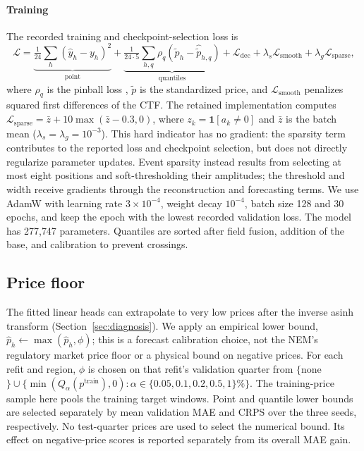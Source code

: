 \documentclass[preprint,12pt]{elsarticle}
\begin{document}
\paragraph{Training} The recorded training and checkpoint-selection loss is
\begin{equation}
\mathcal{L}=\underbrace{\tfrac{1}{24}\textstyle\sum_h(\hat y_h-y_h)^2}_{\text{point}}+\underbrace{\tfrac{1}{24\cdot5}\textstyle\sum_{h,q}\rho_q\!\left(\tilde p_h-\hat{\tilde p}_{h,q}\right)}_{\text{quantiles}}+\mathcal{L}_{\mathrm{dec}}+\lambda_s\mathcal{L}_{\mathrm{smooth}}+\lambda_g\mathcal{L}_{\mathrm{sparse}},
\end{equation}
where $\rho_q$ is the pinball loss \citep{koenker1978regression}, $\tilde p$ is the standardized price, and $\mathcal{L}_{\mathrm{smooth}}$ penalizes squared first differences of the CTF. The retained implementation computes $\mathcal{L}_{\mathrm{sparse}}=\bar z+10\max(\bar z-0.3,0)$, where $z_k=\mathbf{1}[a_k\ne0]$ and $\bar z$ is the batch mean ($\lambda_s=\lambda_g=10^{-3}$). This hard indicator has no gradient: the sparsity term contributes to the reported loss and checkpoint selection, but does not directly regularize parameter updates. Event sparsity instead results from selecting at most eight positions and soft-thresholding their amplitudes; the threshold and width receive gradients through the reconstruction and forecasting terms. We use AdamW with learning rate $3\times10^{-4}$, weight decay $10^{-4}$, batch size 128 and 30 epochs, and keep the epoch with the lowest recorded validation loss. The model has 277{,}747 parameters. Quantiles are sorted after field fusion, addition of the base, and calibration to prevent crossings.

\subsection{Price floor}
The fitted linear heads can extrapolate to very low prices after the inverse asinh transform (Section~\ref{sec:diagnosis}). We apply an empirical lower bound, $\hat p_h\leftarrow\max(\hat p_h,\phi)$; this is a forecast calibration choice, not the NEM's regulatory market price floor or a physical bound on negative prices. For each refit and region, $\phi$ is chosen on that refit's validation quarter from $\{$none$\}\cup\{\min(Q_\alpha(p^{\mathrm{train}}),0):\alpha\in\{0.05,0.1,0.2,0.5,1\}\%\}$. The training-price sample here pools the training target windows. Point and quantile lower bounds are selected separately by mean validation MAE and CRPS over the three seeds, respectively. No test-quarter prices are used to select the numerical bound. Its effect on negative-price scores is reported separately from its overall MAE gain.
\end{document}
